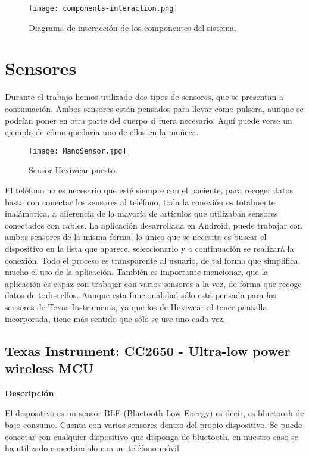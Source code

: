 \documentclass[11pt,spanish]{article}
\begin{document}
\begin{figure}[H]
  \centering
  \texttt{[image: components-interaction.png]}
  \caption{Diagrama de interacción de los componentes del sistema.}
\end{figure}

\section{Sensores}
Durante el trabajo hemos utilizado dos tipos de sensores, que se presentan a continuación. Ambos sensores están pensados para llevar como pulsera, aunque se podrían poner en otra parte del cuerpo si fuera necesario. Aquí puede verse un ejemplo de cómo quedaría uno de ellos en la muñeca.
\begin{figure}[h!]
  \centering
  \texttt{[image: ManoSensor.jpg]}
  \caption{Sensor Hexiwear puesto.}
\end{figure}

El teléfono no es necesario que esté siempre con el paciente, para recoger datos basta con conectar los sensores al teléfono, toda la conexión es totalmente inalámbrica, a diferencia de la mayoría de artículos que utilizaban sensores conectados con cables. La aplicación desarrollada en Android, puede trabajar con ambos sensores de la misma forma, lo único que se necesita es buscar el dispositivo en la lista que aparece, seleccionarlo y a continuación se realizará la conexión. Todo el proceso es transparente al usuario, de tal forma que simplifica mucho el uso de la aplicación. También es importante mencionar, que la aplicación es capaz con trabajar con varios sensores a la vez, de forma que recoge datos de todos ellos. Aunque esta funcionalidad sólo está pensada para los sensores de Texas Instruments, ya que los de Hexiwear al tener pantalla incorporada, tiene más sentido que sólo se use uno cada vez.
\newline

\subsection{Texas Instrument: CC2650 - Ultra-low power wireless MCU}
{\bf Descripción}
\newline

El dispositivo es un sensor BLE (Bluetooth Low Energy) es decir, es bluetooth de bajo consumo. Cuenta con varios sensores dentro del propio dispositivo. Se puede conectar con cualquier dispositivo que disponga de bluetooth, en nuestro caso se ha utilizado conectándolo con un teléfono móvil. 
\newline
\end{document}
